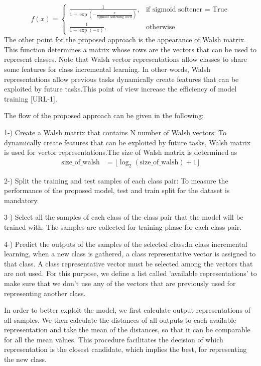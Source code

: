 \documentclass{article}
\begin{document}
\begin{equation}
f(x) =
\begin{cases}
    \frac{1}{{1 + \exp\left(-\frac{x}{{\text{{sigmoid softening coeff}}}}\right)}}, & \text{if sigmoid softener = True} \\
    \frac{1}{{1 + \exp(-x)}}, & \text{otherwise}
\end{cases}
\end{equation}
The other point for the proposed approach is the appearance of Walsh matrix. This function determines a matrix whose rows are the vectors that can be used to represent classes. Note that Walsh vector representations allow classes to share some features for class incremental learning. In other words, Walsh representations allow previous tasks dynamically create features that can be exploited by future tasks.This point of view increase the efficiency of model training [URL-1]. 

The flow of the proposed approach can be given in the following: 

1-) Create a Walsh matrix that contains N number of Walsh vectors: To dynamically create features that can be exploited by future tasks, Walsh matrix is used for vector representations.The size of Walsh matrix is determined as  \begin{align*}
    \text{{size\_of\_walsh}} &= \lfloor \log_2(\text{{size\_of\_walsh}}) + 1 \rfloor
\end{align*}


2-) Split the training and test samples of each class pair: To measure the performance of the proposed model, test and train split for the dataset is mandatory. 


3-) Select all the samples of each class of the class pair that the model will be trained with: The samples are collected for training phase for each class pair. 


4-) Predict the outputs of the samples of the selected class:In class incremental learning, when  a new class is gathered, a class representative vector is assigned to that class. A class representative vector must be selected among the vectors that are not used. For this purpose, we define a list called 'available representations' to make sure that we don't use any of the vectors that are previously used for representing another class. 
    
In order to better exploit the model, we first calculate output representations of all samples. 
We then calculate the distances of all outputs to each available representation and take the mean of the distances, so that  it can be comparable for all the mean values. This procedure facilitates the decision of which representation is the closest candidate, which implies the best, for representing the new class. 
\end{document}
